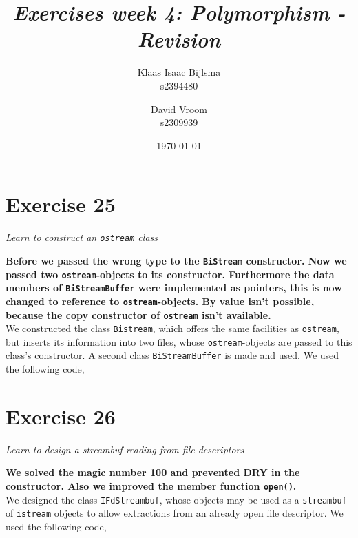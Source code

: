 \documentclass[12pt]{article}
\title{\itshape Exercises week 4: Polymorphism - Revision}
\author{
	Klaas Isaac Bijlsma \\ s2394480
	\and
	David Vroom \\ s2309939
}
\date{\today}
\newcommand{\desc}[1]{\textit{#1} \vspace{1em}}
\begin{document}
\maketitle

\section*{Exercise 25}
\desc{Learn to construct an \texttt{ostream} class}

\textbf{Before we passed the wrong type to the \texttt{BiStream} constructor. Now we passed two \texttt{ostream}-objects to its constructor. Furthermore the data members of \texttt{BiStreamBuffer} were implemented as pointers, this is now changed to reference to \texttt{ostream}-objects. By value isn't possible, because the copy constructor of \texttt{ostream} isn't available.}\\

We constructed the class \texttt{Bistream}, which offers the same facilities as \texttt{ostream}, but inserts its information into two files, whose \texttt{ostream}-objects are passed to this class's constructor. A second class \texttt{BiStreamBuffer} is made and used. We used the following code,









\clearpage

\section*{Exercise 26}
\desc{Learn to design a streambuf reading from file descriptors}

\textbf{We solved the magic number 100 and prevented DRY in the constructor. Also we improved the member function \texttt{open()}.}\\

We designed the class \texttt{IFdStreambuf}, whose objects may be used as a \texttt{streambuf} of \texttt{istream} objects to allow extractions from an already open file descriptor. We used the following code,
\end{document}
